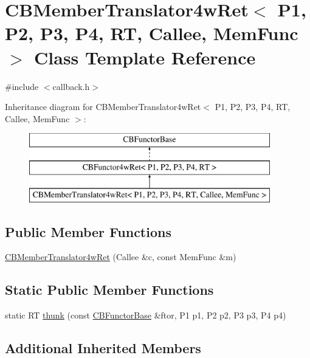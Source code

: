 \hypertarget{class_c_b_member_translator4w_ret}{\section{C\+B\+Member\+Translator4w\+Ret$<$ P1, P2, P3, P4, R\+T, Callee, Mem\+Func $>$ Class Template Reference}
\label{class_c_b_member_translator4w_ret}
}


{\ttfamily \#include $<$callback.\+h$>$}

Inheritance diagram for C\+B\+Member\+Translator4w\+Ret$<$ P1, P2, P3, P4, R\+T, Callee, Mem\+Func $>$\+:\begin{figure}[H]
\begin{center}
\leavevmode
\includegraphics[height=3.000000cm]{class_c_b_member_translator4w_ret}
\end{center}
\end{figure}
\subsection*{Public Member Functions}
\begin{DoxyCompactItemize}
\item 
\hyperlink{class_c_b_member_translator4w_ret_adccf77b2f6c7b9badb20795db06fcbb7}{C\+B\+Member\+Translator4w\+Ret} (Callee \&c, const Mem\+Func \&m)
\end{DoxyCompactItemize}
\subsection*{Static Public Member Functions}
\begin{DoxyCompactItemize}
\item 
static R\+T \hyperlink{class_c_b_member_translator4w_ret_a5f094d9638e1327854be28cb2edcad68}{thunk} (const \hyperlink{class_c_b_functor_base}{C\+B\+Functor\+Base} \&ftor, P1 p1, P2 p2, P3 p3, P4 p4)
\end{DoxyCompactItemize}
\subsection*{Additional Inherited Members}


